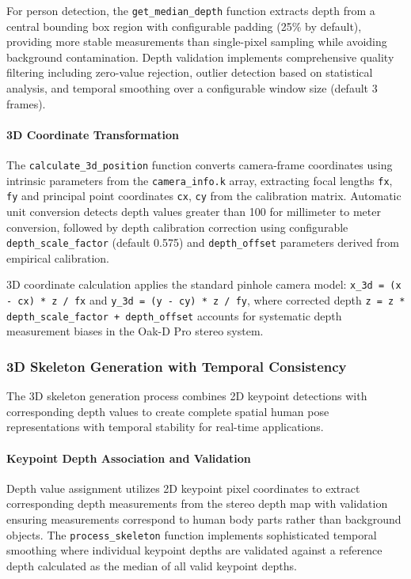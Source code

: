 For person detection, the \texttt{get\_median\_depth} function extracts depth from a central bounding box region with configurable padding (25\% by default), providing more stable measurements than single-pixel sampling while avoiding background contamination. Depth validation implements comprehensive quality filtering including zero-value rejection, outlier detection based on statistical analysis, and temporal smoothing over a configurable window size (default 3 frames).

\paragraph{3D Coordinate Transformation}

The \texttt{calculate\_3d\_position} function converts camera-frame coordinates using intrinsic parameters from the \texttt{camera\_info.k} array, extracting focal lengths \texttt{fx}, \texttt{fy} and principal point coordinates \texttt{cx}, \texttt{cy} from the calibration matrix. Automatic unit conversion detects depth values greater than 100 for millimeter to meter conversion, followed by depth calibration correction using configurable \texttt{depth\_scale\_factor} (default 0.575) and \texttt{depth\_offset} parameters derived from empirical calibration.

3D coordinate calculation applies the standard pinhole camera model: \texttt{x\_3d = (x - cx) * z / fx} and \texttt{y\_3d = (y - cy) * z / fy}, where corrected depth \texttt{z = z * depth\_}\linebreak\texttt{scale\_factor + depth\_offset} accounts for systematic depth measurement biases in the Oak-D Pro stereo system.

\subsubsection{3D Skeleton Generation with Temporal Consistency}

The 3D skeleton generation process combines 2D keypoint detections with corresponding depth values to create complete spatial human pose representations with temporal stability for real-time applications.

\paragraph{Keypoint Depth Association and Validation}

Depth value assignment utilizes 2D keypoint pixel coordinates to extract corresponding depth measurements from the stereo depth map with validation ensuring measurements correspond to human body parts rather than background objects. The \texttt{process\_skeleton} function implements sophisticated temporal smoothing where individual keypoint depths are validated against a reference depth calculated as the median of all valid keypoint depths.

